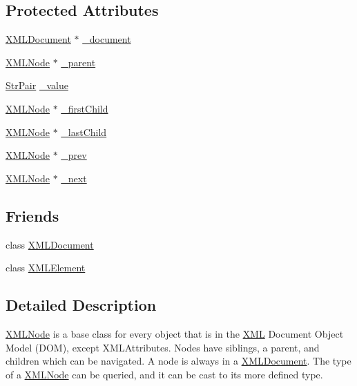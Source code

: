 \subsection*{Protected Attributes}
\begin{DoxyCompactItemize}
\item 
\hyperlink{classtinyxml2_1_1_x_m_l_document}{X\-M\-L\-Document} $\ast$ \hyperlink{classtinyxml2_1_1_x_m_l_node_a8d2d2be0bb6797625551eb0e91f0ff62}{\-\_\-document}
\item 
\hyperlink{classtinyxml2_1_1_x_m_l_node}{X\-M\-L\-Node} $\ast$ \hyperlink{classtinyxml2_1_1_x_m_l_node_a176dd1c4965c21c366de192164aa2c13}{\-\_\-parent}
\item 
\hyperlink{classtinyxml2_1_1_str_pair}{Str\-Pair} \hyperlink{classtinyxml2_1_1_x_m_l_node_a3ea9884098b8379de2bb5ab3fc85c0fc}{\-\_\-value}
\item 
\hyperlink{classtinyxml2_1_1_x_m_l_node}{X\-M\-L\-Node} $\ast$ \hyperlink{classtinyxml2_1_1_x_m_l_node_aa20c91e4213dc930c5bdf420322ca342}{\-\_\-first\-Child}
\item 
\hyperlink{classtinyxml2_1_1_x_m_l_node}{X\-M\-L\-Node} $\ast$ \hyperlink{classtinyxml2_1_1_x_m_l_node_a099b6560ae44ab9edb8453aaf1a3747b}{\-\_\-last\-Child}
\item 
\hyperlink{classtinyxml2_1_1_x_m_l_node}{X\-M\-L\-Node} $\ast$ \hyperlink{classtinyxml2_1_1_x_m_l_node_a9739eb0fb9a1188266052055e7a6bf6b}{\-\_\-prev}
\item 
\hyperlink{classtinyxml2_1_1_x_m_l_node}{X\-M\-L\-Node} $\ast$ \hyperlink{classtinyxml2_1_1_x_m_l_node_a27e985496b37dd00eb5b9cf59b9e3fb1}{\-\_\-next}
\end{DoxyCompactItemize}
\subsection*{Friends}
\begin{DoxyCompactItemize}
\item 
class \hyperlink{classtinyxml2_1_1_x_m_l_node_a4eee3bda60c60a30e4e8cd4ea91c4c6e}{X\-M\-L\-Document}
\item 
class \hyperlink{classtinyxml2_1_1_x_m_l_node_ac2fba9b6e452829dd892f7392c24e0eb}{X\-M\-L\-Element}
\end{DoxyCompactItemize}


\subsection{Detailed Description}
\hyperlink{classtinyxml2_1_1_x_m_l_node}{X\-M\-L\-Node} is a base class for every object that is in the \hyperlink{namespace_x_m_l}{X\-M\-L} Document Object Model (D\-O\-M), except X\-M\-L\-Attributes. Nodes have siblings, a parent, and children which can be navigated. A node is always in a \hyperlink{classtinyxml2_1_1_x_m_l_document}{X\-M\-L\-Document}. The type of a \hyperlink{classtinyxml2_1_1_x_m_l_node}{X\-M\-L\-Node} can be queried, and it can be cast to its more defined type.

